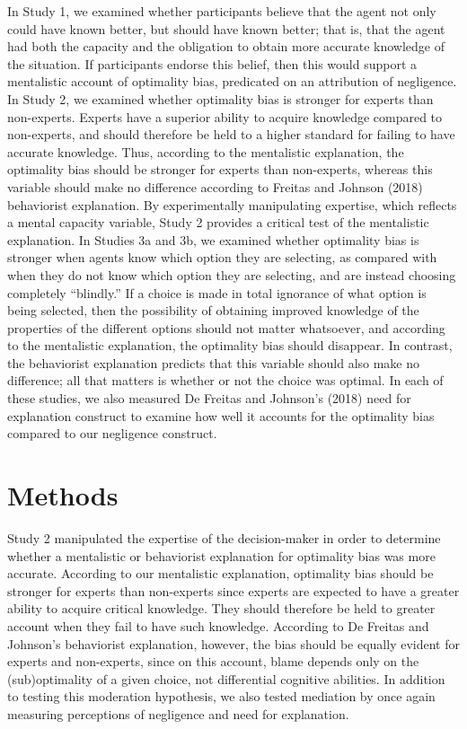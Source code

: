 \documentclass[
  man,floatsintext]{apa6}
\begin{document}
In Study 1, we examined whether participants believe that the agent not only could have known better, but should have known better; that is, that the agent had both the capacity and the obligation to obtain more accurate knowledge of the situation. If participants endorse this belief, then this would support a mentalistic account of optimality bias, predicated on an attribution of negligence. In Study 2, we examined whether optimality bias is stronger for experts than non-experts. Experts have a superior ability to acquire knowledge compared to non-experts, and should therefore be held to a higher standard for failing to have accurate knowledge. Thus, according to the mentalistic explanation, the optimality bias should be stronger for experts than non-experts, whereas this variable should make no difference according to Freitas and Johnson (2018) behaviorist explanation. By experimentally manipulating expertise, which reflects a mental capacity variable, Study 2 provides a critical test of the mentalistic explanation. In Studies 3a and 3b, we examined whether optimality bias is stronger when agents know which option they are selecting, as compared with when they do not know which option they are selecting, and are instead choosing completely ``blindly.'' If a choice is made in total ignorance of what option is being selected, then the possibility of obtaining improved knowledge of the properties of the different options should not matter whatsoever, and according to the mentalistic explanation, the optimality bias should disappear. In contrast, the behaviorist explanation predicts that this variable should also make no difference; all that matters is whether or not the choice was optimal. In each of these studies, we also measured De Freitas and Johnson's (2018) need for explanation construct to examine how well it accounts for the optimality bias compared to our negligence construct.

\hypertarget{methods}{%
\section{Methods}\label{methods}}

Study 2 manipulated the expertise of the decision-maker in order to determine whether a mentalistic or behaviorist explanation for optimality bias was more accurate. According to our mentalistic explanation, optimality bias should be stronger for experts than non-experts since experts are expected to have a greater ability to acquire critical knowledge. They should therefore be held to greater account when they fail to have such knowledge. According to De Freitas and Johnson's behaviorist explanation, however, the bias should be equally evident for experts and non-experts, since on this account, blame depends only on the (sub)optimality of a given choice, not differential cognitive abilities. In addition to testing this moderation hypothesis, we also tested mediation by once again measuring perceptions of negligence and need for explanation.
\end{document}
